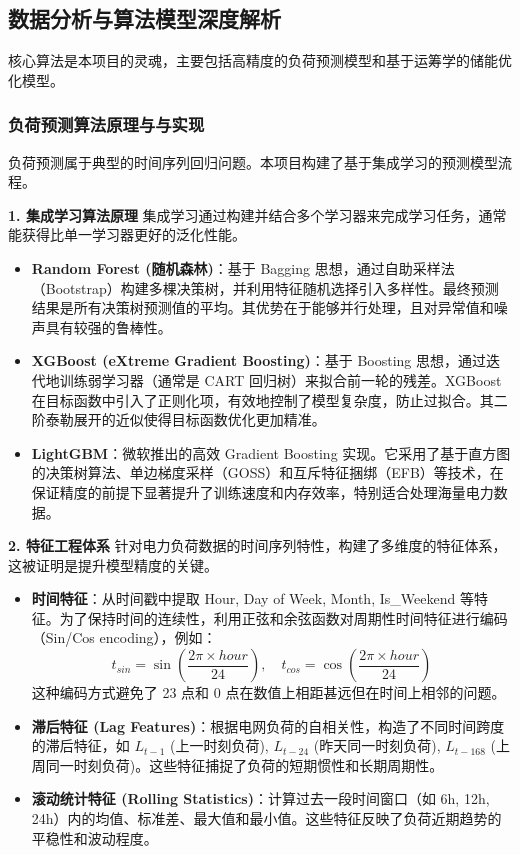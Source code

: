 \subsection{数据分析与算法模型深度解析}

核心算法是本项目的灵魂，主要包括高精度的负荷预测模型和基于运筹学的储能优化模型。

\subsubsection{负荷预测算法原理与与实现}
负荷预测属于典型的时间序列回归问题。本项目构建了基于集成学习的预测模型流程。

\textbf{1. 集成学习算法原理}
集成学习通过构建并结合多个学习器来完成学习任务，通常能获得比单一学习器更好的泛化性能。
\begin{itemize}
    \item \textbf{Random Forest (随机森林)}\cite{breiman2001random}：基于 Bagging 思想，通过自助采样法（Bootstrap）构建多棵决策树，并利用特征随机选择引入多样性。最终预测结果是所有决策树预测值的平均。其优势在于能够并行处理，且对异常值和噪声具有较强的鲁棒性。
    \item \textbf{XGBoost (eXtreme Gradient Boosting)}\cite{chen2016xgboost}：基于 Boosting 思想，通过迭代地训练弱学习器（通常是 CART 回归树）来拟合前一轮的残差。XGBoost 在目标函数中引入了正则化项，有效地控制了模型复杂度，防止过拟合。其二阶泰勒展开的近似使得目标函数优化更加精准。
    \item \textbf{LightGBM}：微软推出的高效 Gradient Boosting 实现。它采用了基于直方图的决策树算法、单边梯度采样（GOSS）和互斥特征捆绑（EFB）等技术，在保证精度的前提下显著提升了训练速度和内存效率，特别适合处理海量电力数据。
\end{itemize}

\textbf{2. 特征工程体系}
针对电力负荷数据的时间序列特性，构建了多维度的特征体系，这被证明是提升模型精度的关键。
\begin{itemize}
    \item \textbf{时间特征}：从时间戳中提取 Hour, Day of Week, Month, Is\_Weekend 等特征。为了保持时间的连续性，利用正弦和余弦函数对周期性时间特征进行编码（Sin/Cos encoding），例如：
          \[
              t_{sin} = \sin\left(\frac{2\pi \times hour}{24}\right), \quad t_{cos} = \cos\left(\frac{2\pi \times hour}{24}\right)
          \]
          这种编码方式避免了 23 点和 0 点在数值上相距甚远但在时间上相邻的问题。
    \item \textbf{滞后特征 (Lag Features)}：根据电网负荷的自相关性，构造了不同时间跨度的滞后特征，如 $L_{t-1}$ (上一时刻负荷), $L_{t-24}$ (昨天同一时刻负荷), $L_{t-168}$ (上周同一时刻负荷)。这些特征捕捉了负荷的短期惯性和长期周期性。
    \item \textbf{滚动统计特征 (Rolling Statistics)}：计算过去一段时间窗口（如 6h, 12h, 24h）内的均值、标准差、最大值和最小值。这些特征反映了负荷近期趋势的平稳性和波动程度。
\end{itemize}


